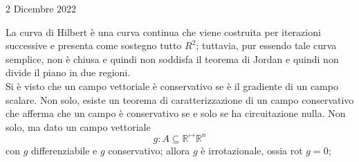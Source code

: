 \documentclass[a4paper]{extarticle}
\begin{document}
\newpage
\noindent
\begin{center}
    2 Dicembre 2022
\end{center}
La curva di Hilbert è una curva continua che viene costruita per iterazioni successive e presenta come sostegno tutto $R^2$; tuttavia, pur essendo tale curva semplice, non è chiusa e quindi non soddisfa il teorema di Jordan e quindi non divide il piano in due regioni.\\
Si è visto che un campo vettoriale è conservativo se è il gradiente di un campo scalare. Non solo, esiste un teorema di caratterizzazione di un campo conservativo che afferma che un campo è conservativo se e solo se ha circuitazione nulla. Non solo, ma dato un campo vettoriale
\[g : A \subseteq \mathbb{R}^ \longmapsto \mathbb{R}^n\]
con $g$ differenziabile e $g$ conservativo; allora $g$ è irrotazionale, ossia rot $g = 0$;
\end{document}
